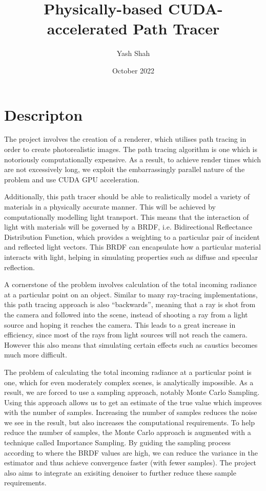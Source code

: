 \documentclass[12pt, a4paper]{article}
\title{Physically-based CUDA-accelerated Path Tracer}
\author{Yash Shah}
\date{October 2022}
\begin{document}
    \maketitle
    
    \section*{Descripton}
    The project involves the creation of a renderer, which utilises path tracing in order to create photorealistic images. The path tracing algorithm is one which is notoriously computationally expensive. As a result, to achieve render times which are not excessively long, we exploit the embarrassingly parallel nature of the problem and use CUDA GPU acceleration.

    Additionally, this path tracer should be able to realistically model a variety of materials in a physically accurate manner. This will be achieved by computationally modelling light transport. This means that the interaction of light with materials will be governed by a BRDF, i.e. Bidirectional Reflectance Distribution Function, which provides a weighting to a particular pair of incident and reflected light vectors. This BRDF can encapsulate how a particular material interacts with light, helping in simulating properties such as diffuse and specular reflection.

    A cornerstone of the problem involves calculation of the total incoming radiance at a particular point on an object. Similar to many ray-tracing implementations, this path tracing approach is also “backwards”, meaning that a ray is shot from the camera and followed into the scene, instead of shooting a ray from a light source and hoping it reaches the camera. This leads to a great increase in efficiency, since most of the rays from light sources will not reach the camera. However this also means that simulating certain effects such as caustics becomes much more difficult.

    The problem of calculating the total incoming radiance at a particular point is one, which for even moderately complex scenes, is analytically impossible. As a result, we are forced to use a sampling approach, notably Monte Carlo Sampling. Using this approach allows us to get an estimate of the true value which improves with the number of samples. Increasing the number of samples reduces the noise we see in the result, but also increases the computational requirements. To help reduce the number of samples, the Monte Carlo approach is augmented with a technique called Importance Sampling. By guiding the sampling process according to where the BRDF values are high, we can reduce the variance in the estimator and thus achieve convergence faster (with fewer samples). The project also aims to integrate an exisiting denoiser to further reduce these sample requirements.
\end{document}
